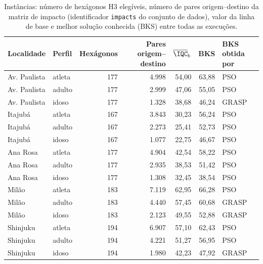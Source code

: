 \begin{table}[t]
\centering
\caption{Instâncias: número de hexágonos H3 elegíveis, número de pares origem--destino da matriz de impacto (identificador \texttt{impacts} do conjunto de dados), valor da linha de base e melhor solução conhecida (BKS) entre todas as execuções.}
\label{tab:instances}
\footnotesize
\begin{tabular}{@{}llrrrrl@{}}
\toprule
Localidade & Perfil & Hexágonos & Pares origem--destino & $\overline{\IQC}_b$ & BKS & BKS obtida por \\
\midrule
Av. Paulista & atleta & 177 & 4.998 & 54,00 & 63,88 & PSO \\
Av. Paulista & adulto & 177 & 2.999 & 47,06 & 55,05 & PSO \\
Av. Paulista & idoso & 177 & 1.328 & 38,68 & 46,24 & GRASP \\
Itajubá & atleta & 167 & 3.843 & 30,23 & 56,24 & PSO \\
Itajubá & adulto & 167 & 2.273 & 25,41 & 52,73 & PSO \\
Itajubá & idoso & 167 & 1.077 & 22,75 & 46,67 & PSO \\
Ana Rosa & atleta & 177 & 4.904 & 42,54 & 58,22 & PSO \\
Ana Rosa & adulto & 177 & 2.935 & 38,53 & 51,42 & PSO \\
Ana Rosa & idoso & 177 & 1.308 & 32,45 & 38,54 & PSO \\
Milão & atleta & 183 & 7.119 & 62,95 & 66,28 & PSO \\
Milão & adulto & 183 & 4.440 & 57,45 & 60,68 & GRASP \\
Milão & idoso & 183 & 2.123 & 49,55 & 52,88 & GRASP \\
Shinjuku & atleta & 194 & 6.907 & 57,10 & 62,43 & PSO \\
Shinjuku & adulto & 194 & 4.221 & 51,27 & 56,95 & PSO \\
Shinjuku & idoso & 194 & 1.980 & 42,23 & 47,92 & GRASP \\
\bottomrule
\end{tabular}
\end{table}
